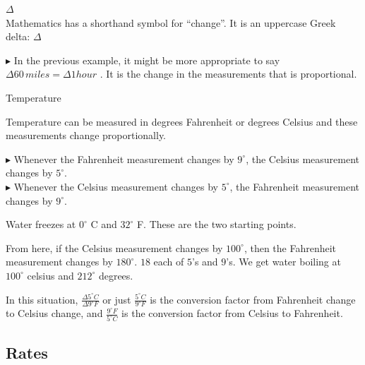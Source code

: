 \documentclass{ximera}
\begin{document}
\begin{notation}  \textbf{\textcolor{red!50!green}{$\Delta$}} \\


Mathematics has a shorthand symbol for ``change''.  It is an uppercase Greek delta: $\Delta$

\end{notation}

\textbf{\textcolor{purple!85!blue}{$\blacktriangleright$}}  In the previous example, it might be more appropriate to say \textbf{\textcolor{purple!85!blue}{$\Delta 60 \, miles = \Delta 1 hour$}} . It is the change in the measurements that is proportional.




\begin{example} Temperature


Temperature can be measured in degrees Fahrenheit or degrees Celsius and these measurements change proportionally. 


$\blacktriangleright$ Whenever the Fahrenheit measurement changes by $9^{\circ}$, the Celsius measurement changes by $5^{\circ}$. \\
$\blacktriangleright$ Whenever the Celsius measurement changes by $5^{\circ}$, the Fahrenheit measurement changes by $9^{\circ}$. 



Water freezes at $0^{\circ}$ C and $32^{\circ}$ F.  These are the two starting points.

From here, if the Celsius measurement changes by $100^{\circ}$, then the Fahrenheit measurement changes by $180^{\circ}$.  $18$ each of $5$'s and $9$'s. We get water boiling at $100^{\circ}$ celsius and $212^{\circ}$ degrees.


In this situation, $\frac{\Delta 5^{\circ}C}{\Delta 9^{\circ}F}$ or just $\frac{5^{\circ}C}{9^{\circ}F}$ is the conversion factor from Fahrenheit change to Celsius change, and $\frac{9^{\circ}F}{5^{\circ}C}$ is the conversion factor from Celsius to Fahrenheit.






\end{example} 
















\subsection*{Rates}
\end{document}
